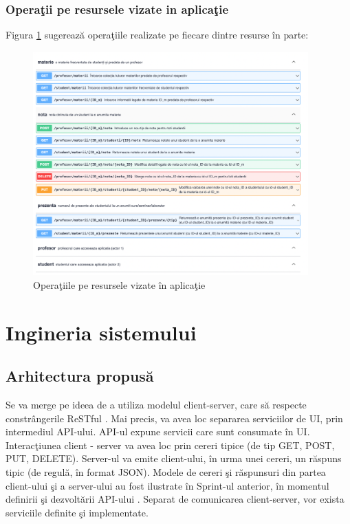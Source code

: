 \documentclass{report}
\begin{document}
\newpage 

\subsection{Opera\c tii pe resursele vizate in aplica\c tie}

Figura \ref{swagger_ops} sugerează opera\c tiile \cite{Masse2011} realizate pe fiecare dintre resurse în parte:

\begin{figure}[h!]
    \centering
    \includegraphics[width=300pt]{img/swagger_ops.png}
    \caption{Opera\c tiile pe resursele vizate în aplica\c tie}
    \label{swagger_ops}
\end{figure}
\chapter{Ingineria sistemului}
\section{Arhitectura propusă}
Se va merge pe ideea de a utiliza modelul client-server, care să respecte constrângerile ReSTful \cite{Masse2011}. Mai precis, va avea loc separarea serviciilor de UI, prin intermediul API-ului. API-ul expune servicii care sunt consumate în UI.
Interac\c tiunea client - server va avea loc prin cereri tipice (de tip GET, POST, PUT, DELETE). Server-ul va emite client-ului, în urma unei cereri, un răspuns tipic (de regulă, în format JSON). Modele de cereri \c si răspunsuri din partea client-ului \c si a server-ului au fost ilustrate în Sprint-ul anterior, în momentul definirii \c si dezvoltării API-ului \cite{Vaswani2008-ms}.
Separat de comunicarea client-server, vor exista serviciile definite \c si implementate.
\end{document}
